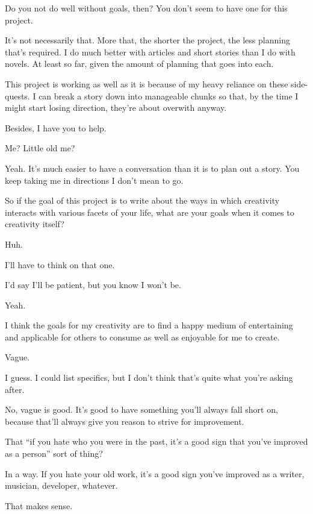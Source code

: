 \begin{paracol}{2}
\begin{leftcolumn}
\begin{ally}
Do you not do well without goals, then? You don't seem to have one for this project.
\end{ally}
It's not necessarily that. More that, the shorter the project, the less planning that's required. I do much better with articles and short stories than I do with novels. At least so far, given the amount of planning that goes into each.

This project is working as well as it is because of my heavy reliance on these side-quests. I can break a story down into manageable chunks so that, by the time I might start losing direction, they're about overwith anyway.

Besides, I have you to help.

\begin{ally}
Me? Little old me?
\end{ally}
Yeah. It's much easier to have a conversation than it is to plan out a story. You keep taking me in directions I don't mean to go.
\newpage

\begin{ally}
So if the goal of this project is to write about the ways in which creativity interacts with various facets of your life, what are your goals when it comes to creativity itself?
\end{ally}
Huh.

I'll have to think on that one.

\begin{ally}
I'd say I'll be patient, but you know I won't be.
\end{ally}
Yeah.

I think the goals for my creativity are to find a happy medium of entertaining and applicable for others to consume as well as enjoyable for me to create.

\begin{ally}
Vague.
\end{ally}
I guess. I could list specifics, but I don't think that's quite what you're asking after.

\begin{ally}
No, vague is good. It's good to have something you'll always fall short on, because that'll always give you reason to strive for improvement.
\end{ally}
That ``if you hate who you were in the past, it's a good sign that you've improved as a person'' sort of thing?

\begin{ally}
In a way. If you hate your old work, it's a good sign you've improved as a writer, musician, developer, whatever.
\end{ally}
That makes sense.


\end{leftcolumn}
\end{paracol}
